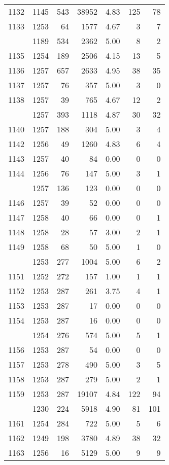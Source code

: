 \documentclass[
]{article}
\begin{document}
\begin{table}
\begin{tabular}[t]{lrrrrrr}
1132 & 1145 & 543 & 38952 & 4.83 & 125 & 78\\
1133 & 1253 & 64 & 1577 & 4.67 & 3 & 7\\
\addlinespace
1134 & 1189 & 534 & 2362 & 5.00 & 8 & 2\\
1135 & 1254 & 189 & 2506 & 4.15 & 13 & 5\\
1136 & 1257 & 657 & 2633 & 4.95 & 38 & 35\\
1137 & 1257 & 76 & 357 & 5.00 & 3 & 0\\
1138 & 1257 & 39 & 765 & 4.67 & 12 & 2\\
\addlinespace
1139 & 1257 & 393 & 1118 & 4.87 & 30 & 32\\
1140 & 1257 & 188 & 304 & 5.00 & 3 & 4\\
1142 & 1256 & 49 & 1260 & 4.83 & 6 & 4\\
1143 & 1257 & 40 & 84 & 0.00 & 0 & 0\\
1144 & 1256 & 76 & 147 & 5.00 & 3 & 1\\
\addlinespace
1145 & 1257 & 136 & 123 & 0.00 & 0 & 0\\
1146 & 1257 & 39 & 52 & 0.00 & 0 & 0\\
1147 & 1258 & 40 & 66 & 0.00 & 0 & 1\\
1148 & 1258 & 28 & 57 & 3.00 & 2 & 1\\
1149 & 1258 & 68 & 50 & 5.00 & 1 & 0\\
\addlinespace
1150 & 1253 & 277 & 1004 & 5.00 & 6 & 2\\
1151 & 1252 & 272 & 157 & 1.00 & 1 & 1\\
1152 & 1253 & 287 & 261 & 3.75 & 4 & 1\\
1153 & 1253 & 287 & 17 & 0.00 & 0 & 0\\
1154 & 1253 & 287 & 16 & 0.00 & 0 & 0\\
\addlinespace
1155 & 1254 & 276 & 574 & 5.00 & 5 & 1\\
1156 & 1253 & 287 & 54 & 0.00 & 0 & 0\\
1157 & 1253 & 278 & 490 & 5.00 & 3 & 5\\
1158 & 1253 & 287 & 279 & 5.00 & 2 & 1\\
1159 & 1253 & 287 & 19107 & 4.84 & 122 & 94\\
\addlinespace
1160 & 1230 & 224 & 5918 & 4.90 & 81 & 101\\
1161 & 1254 & 284 & 722 & 5.00 & 5 & 6\\
1162 & 1249 & 198 & 3780 & 4.89 & 38 & 32\\
1163 & 1256 & 16 & 5129 & 5.00 & 9 & 9\\

\end{tabular}
\end{table}
\end{document}

